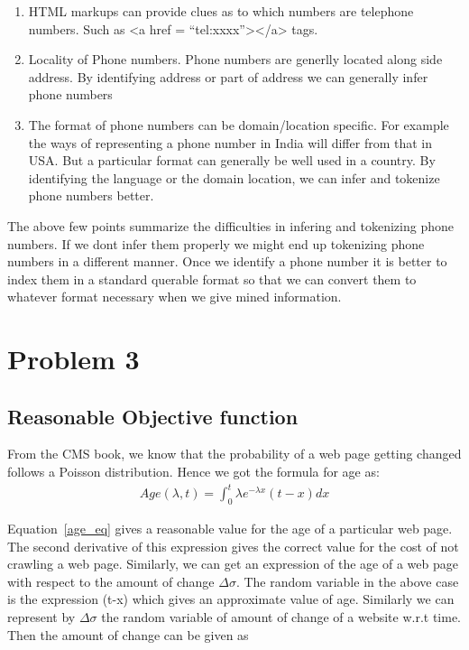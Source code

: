 \documentclass{article}
\begin{document}
\begin{enumerate}
  \item HTML markups can provide clues as to which numbers are telephone numbers.  Such as <a href = ``tel:xxxx''></a> tags.
  \item Locality of Phone numbers. Phone numbers are generlly located along side address.  By identifying address or part of address we can generally infer phone numbers
  \item  The format of phone numbers can be domain/location specific.  For example the ways of representing a phone number in India will differ from that in USA\@.  But a particular format can generally be well used in a country.  By identifying the language or the domain location, we can infer and tokenize phone numbers better.
\end{enumerate}

The above few points summarize the difficulties in infering and tokenizing phone numbers.  If we dont infer them properly we might end up tokenizing phone numbers in a different manner.  Once we identify a phone number it is better to index them in a standard querable format so that we can convert them to whatever format necessary when we give mined information.

\section[Problem 3]{Problem 3}
\subsection{Reasonable Objective function}
From the CMS book, we know that the probability of a web page getting changed follows a Poisson distribution.  Hence we got the formula for age as:
\begin{align}
  \label{age_eq}
  Age(\lambda, t) = \int_{0}^{t} \lambda e^{-\lambda x}(t - x)dx
\end{align}

Equation~\eqref{age_eq} gives a reasonable value for the age of a particular web page.  The second derivative of this expression gives the correct value for the cost of not crawling a web page.  Similarly, we can get an expression of the age of a web page with respect to the amount of change $\Delta \sigma$.  The random variable in the above case is the expression (t-x) which gives an approximate value of age.  Similarly we can represent by $\Delta\sigma$ the random variable of amount of change of a website w.r.t time.  Then the amount of change can be given as 
\end{document}
